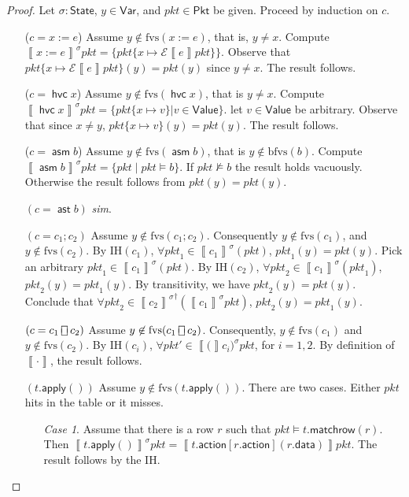 \documentclass{article}
\newcommand{\pkt}{\mathit{pkt}}
\newcommand{\denote}[1]{\left\llbracket#1\right\rrbracket}
\newcommand{\edenote}[1]{\mathcal{E}\denote{#1}}
\newcommand{\Value}{\mathsf{Value}}
\newcommand{\Pkt}{\mathsf{Pkt}}
\newcommand{\Var}{\mathsf{Var}}
\newcommand{\State}{\mathsf{State}}
\newcommand{\action}{\mathsf{action}}
\newcommand{\data}{\mathsf{data}}
\newcommand{\assert}{\mathop{\mathsf{ast}}}
\newcommand{\assume}{\mathop{\mathsf{asm}}}
\newcommand{\apply}{\mathsf{apply}}
\newcommand{\choiceop}{\rotatebox[origin=c]{90}{$\sqsubset\!\!\!\sqsupset$}}
\newcommand{\choice}{\mathbin{\choiceop}}
\newcommand{\havoc}[1]{\mathop{\mathsf{hvc}}#1}
\newcommand{\fvs}{\textrm{fvs}}
\newcommand{\bfvs}{\textrm{bfvs}}
\newcommand{\matchrow}{\mathsf{matchrow}}
\theoremstyle{plain}
\theoremstyle{definition}
\theoremstyle{remark}
\begin{document}
\begin{proof}
  Let $\sigma : \State $, $y \in \Var$, and $\pkt \in \Pkt$ be given.
  Proceed by induction on $c$.
  \begin{enumerate}[align=left]
  \item[($c = x := e$)] Assume $y \not \in \fvs(x:=e)$, that is, $y \neq x$.
    Compute $\denote{x:=e}^\sigma \pkt = \{\pkt\{ x \mapsto \edenote e
    \pkt\}\}$. Observe that $\pkt\{ x \mapsto \edenote e \pkt\}(y) = \pkt(y)$
    since $y \neq x$. The result follows.

  \item[($c = \havoc x$)] Assume $y \not \in \fvs(\havoc x)$, that is $y \neq
    x$. Compute $\denote{\havoc x}^\sigma\pkt = \{\pkt\{x \mapsto v\} | v \in
    \Value\}$. let $v \in \Value$ be arbitrary. Observe that since $x \neq y$,
    $\pkt\{x \mapsto v\}(y) = \pkt(y)$. The result follows.

  \item[($c = \assume b$)] Assume $y \not \in \fvs(\assume b)$, that is $y
    \not\in \bfvs(b)$. Compute $\denote{\assume b}^\sigma \pkt = \{\pkt \mid
    \pkt \models b\}$. If $\pkt \not\models b$ the result holds vacuously.
    Otherwise the result follows from $\pkt(y) = \pkt(y)$.

  \item[$(c = \assert b)$] \textit{sim}.

  \item[$(c = c_1;c_2)$] Assume $y \not \in \fvs(c_1;c_2)$. Consequently $y
    \not\in \fvs(c_1)$, and $y \not \in \fvs(c_2)$. By IH$(c_1)$, $\forall
    \pkt_1 \in \denote{c_1}^\sigma(\pkt)$, $\pkt_1(y) = pkt(y)$. Pick an
    arbitrary $\pkt_1 \in \denote{c_1}^\sigma(\pkt)$. By IH$(c_2)$, $\forall
    \pkt_2 \in \denote{c_1}^\sigma(\pkt_1)$, $\pkt_2(y) = \pkt_1(y)$. By
    transitivity, we have $\pkt_2(y) = \pkt(y)$. Conclude that $\forall \pkt_2
    \in {\denote{c_2}^\sigma}^\dagger (\denote{c_1}^\sigma \pkt)$, $\pkt_2(y) =
    \pkt_1(y)$.

  \item[$(c = c_1 \choice c_2)$] Assume $y \not \in \fvs(c_1 \choice c_2)$.
    Consequently, $y \not \in \fvs(c_1)$ and $y \not \in \fvs(c_2)$.
    By IH$(c_i)$, $\forall \pkt' \in \denote(c_i)^\sigma\pkt$, for $i = 1,2$.
    By definition of $\denote{\cdot}$, the result follows.

  \item[$(t.\apply())$] Assume $y \not\in \fvs(t.\apply())$.
    There are two cases. Either $\pkt$ hits in the table or it misses.
    \begin{enumerate}[align=left]
    \item[\textit{Case 1}.] Assume that there is a row $r$ such that $\pkt
      \models t.\matchrow(r)$. Then $\denote{t.\apply()}^\sigma \pkt =
      \denote{t.\action[r.\action](r.\data)} \pkt$. The result follows by the
      IH.


\end{enumerate}
\end{enumerate}
\end{proof}
\end{document}
